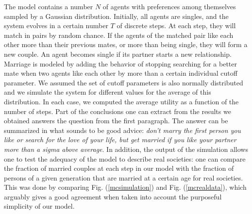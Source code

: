 \documentclass[12pt]{article}
\begin{document}
The model contains a number $N$ of agents with preferences among themselves sampled by a Gaussian distribution. Initially, all agents are singles, and the system evolves in a certain number $T$ of discrete steps. At each step, they will match in pairs by random chance. If the agents of the matched pair like each other more than their previous mates, or more than being single, they will form a new couple. An agent becomes single if its partner starts a new relationship. Marriage is modeled by adding the behavior of stopping searching for a better mate when two agents like each other by more than a certain individual cutoff parameter. We assumed the set of cutoff parameters is also normally distributed and we simulate the system for different values for the average of this distribution. In each case, we computed the average utility as a function of the number of steps. Part of the conclusions one can extract from the results we obtained answers the question from the first paragraph. The answer can be summarized in what sounds to be good advice: \textit{don’t marry the first person you like or search for the love of your life, but get married if you like your partner more than a sigma above average}. In addition, the output of the simulation allows one to test the adequacy of the model to describe real societies: one can compare the fraction of married couples at each step in our model with the fraction of persons of a given generation that are married at a certain age for real societies. This was done by comparing Fig. (\ref{mcsimulation}) and Fig. (\ref{mcrealdata}), which arguably gives a good agreement when taken into account the purposeful simplicity of our model.



\end{document}
